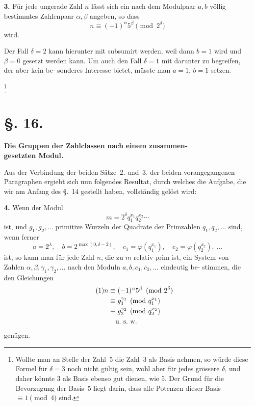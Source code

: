 \documentclass[12pt,a4paper]{article}
\theoremstyle{plain}
\theoremstyle{definition}
\theoremstyle{remark}
\begin{document}
\textbf{3.} Für jede ungerade Zahl $n$ lässt sich ein nach dem
Modulpaar $a, b$ völlig bestimmtes Zahlenpaar $\alpha, \beta$
angeben, so dass
\[
n \equiv (-1)^\alpha 5^\beta \pmod{2^\delta}
\]
wird.

Der Fall $\delta = 2$ kann hierunter mit subsumirt werden, weil
dann $b = 1$ wird und $\beta = 0$ gesetzt werden kann. Um auch
den Fall $\delta = 1$ mit darunter zu begreifen, der aber kein be-
sonderes Interesse bietet, müsste man $a = 1$, $b = 1$ setzen.

\footnote{%
Wollte man an Stelle der Zahl~$5$ die Zahl~$3$ als Basis nehmen, so
würde diese Formel für $\delta = 3$ noch nicht gültig sein, wohl aber für jedes
grössere $\delta$, und daher könnte $3$ als Basis ebenso gut dienen, wie $5$. Der
Grund für die Bevorzugung der Basis~$5$ liegt darin, dass alle Potenzen
dieser Basis $\equiv 1 \pmod{4}$ sind.}


\section*{\S. 16.}
\begin{center}
\textbf{Die Gruppen der Zahlclassen nach einem zusammen-}\\
\textbf{gesetzten Modul.}
\end{center}

Aus der Verbindung der beiden Sätze~2. und~3. der beiden
vorangegangenen Paragraphen ergiebt sich nun folgendes Resultat,
durch welches die Aufgabe, die wir am Anfang des \S.~14 gestellt
haben, vollständig gelöst wird:

\textbf{4.} Wenn der Modul
\[
m = 2^\delta q_1^{x_1} q_2^{x_2} \cdots
\]
ist, und $g_1, g_2, \ldots$ primitive Wurzeln der Quadrate
der Primzahlen $q_1, q_2, \ldots$ sind, wenn ferner
\[
a = 2^\lambda, \quad b = 2^{\max(0,\delta-2)}, \quad c_1 = \varphi(q_1^{x_1}), \quad c_2 = \varphi(q_2^{x_2}), \ \ldots
\]
ist, so kann man für jede Zahl $n$, die zu $m$ relativ
prim ist, ein System von Zahlen $\alpha, \beta, \gamma_1, \gamma_2, \ldots$
nach den Moduln $a, b, c_1, c_2, \ldots$ eindeutig be-
stimmen, die den Gleichungen
\begin{align}\tag{1}
n &\equiv (-1)^\alpha 5^\beta \pmod{2^\delta} \\
  &\equiv g_1^{\gamma_1} \pmod{q_1^{x_1}} \notag\\
  &\equiv g_2^{\gamma_2} \pmod{q_2^{x_2}} \notag\\
  &\quad \text{u.~s.~w.} \notag
\end{align}
genügen.
\end{document}
